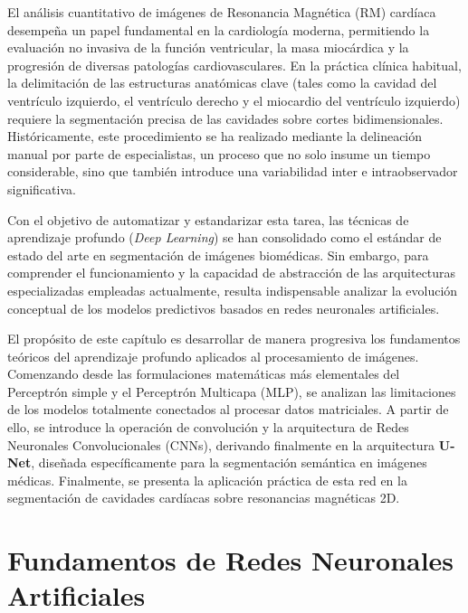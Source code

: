 
El análisis cuantitativo de imágenes de Resonancia Magnética (RM) cardíaca desempeña un papel fundamental en la cardiología moderna, permitiendo la evaluación no invasiva de la función ventricular, la masa miocárdica y la progresión de diversas patologías cardiovasculares. En la práctica clínica habitual, la delimitación de las estructuras anatómicas clave (tales como la cavidad del ventrículo izquierdo, el ventrículo derecho y el miocardio del ventrículo izquierdo) requiere la segmentación precisa de las cavidades sobre cortes bidimensionales. Históricamente, este procedimiento se ha realizado mediante la delineación manual por parte de especialistas, un proceso que no solo insume un tiempo considerable, sino que también introduce una variabilidad inter e intraobservador significativa.

Con el objetivo de automatizar y estandarizar esta tarea, las técnicas de aprendizaje profundo (\textit{Deep Learning}) se han consolidado como el estándar de estado del arte en segmentación de imágenes biomédicas. Sin embargo, para comprender el funcionamiento y la capacidad de abstracción de las arquitecturas especializadas empleadas actualmente, resulta indispensable analizar la evolución conceptual de los modelos predictivos basados en redes neuronales artificiales.

El propósito de este capítulo es desarrollar de manera progresiva los fundamentos teóricos del aprendizaje profundo aplicados al procesamiento de imágenes. Comenzando desde las formulaciones matemáticas más elementales del Perceptrón simple y el Perceptrón Multicapa (MLP), se analizan las limitaciones de los modelos totalmente conectados al procesar datos matriciales. A partir de ello, se introduce la operación de convolución y la arquitectura de Redes Neuronales Convolucionales (CNNs), derivando finalmente en la arquitectura \textbf{U-Net}, diseñada específicamente para la segmentación semántica en imágenes médicas. Finalmente, se presenta la aplicación práctica de esta red en la segmentación de cavidades cardíacas sobre resonancias magnéticas 2D.


\section{Fundamentos de Redes Neuronales Artificiales}

